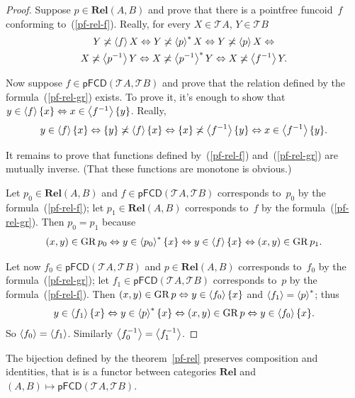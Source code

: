 \begin{proof}
Suppose $p\in\mathbf{Rel}(A,B)$ and prove that there is a pointfree
funcoid~$f$ conforming to~(\ref{pf-rel-f}). Really, for every
$X\in\mathscr{T}A$, $Y\in\mathscr{T}B$ 
\begin{multline*}
Y\not\asymp\left\langle f\right\rangle X\Leftrightarrow Y\not\asymp\left\langle p\right\rangle ^{\ast}X\Leftrightarrow Y\not\asymp\left\langle p\right\rangle X\Leftrightarrow\\
X\not\asymp\left\langle p^{-1}\right\rangle Y\Leftrightarrow X\not\asymp\left\langle p^{-1}\right\rangle ^{\ast}Y\Leftrightarrow X\not\asymp\left\langle f^{-1}\right\rangle Y.
\end{multline*}


Now suppose $f\in\mathsf{pFCD}(\mathscr{T}A,\mathscr{T}B)$ and prove
that the relation defined by the formula~(\ref{pf-rel-gr}) exists.
To prove it, it's enough to show that $y\in\left\langle f\right\rangle\{x\}\Leftrightarrow x\in\left\langle f^{-1}\right\rangle\{y\}$.
Really, 
\[
y\in\left\langle f\right\rangle\{x\}\Leftrightarrow\{y\}\not\asymp\left\langle f\right\rangle\{x\}\Leftrightarrow\{x\}\not\asymp\left\langle f^{-1}\right\rangle\{y\}\Leftrightarrow x\in\left\langle f^{-1}\right\rangle\{y\}.
\]


It remains to prove that functions defined by~(\ref{pf-rel-f}) and~(\ref{pf-rel-gr})
are mutually inverse. (That these functions are monotone is obvious.)

Let $p_{0}\in\mathbf{Rel}(A,B)$ and $f\in\mathsf{pFCD}(\mathscr{T}A,\mathscr{T}B)$
corresponds to~$p_{0}$ by the formula~(\ref{pf-rel-f}); let $p_{1}\in\mathbf{Rel}(A,B)$
corresponds to~$f$ by the formula~(\ref{pf-rel-gr}). Then $p_{0}=p_{1}$
because 
\[
(x,y)\in\operatorname{GR} p_{0}\Leftrightarrow y\in\left\langle p_{0}\right\rangle ^{\ast}\{x\}\Leftrightarrow y\in\left\langle f\right\rangle\{x\}\Leftrightarrow(x,y)\in\operatorname{GR} p_{1}.
\]


Let now $f_{0}\in\mathsf{pFCD}(\mathscr{T}A,\mathscr{T}B)$ and $p\in\mathbf{Rel}(A,B)$
corresponds to~$f_{0}$ by the formula~(\ref{pf-rel-gr}); let $f_{1}\in\mathsf{pFCD}(\mathscr{T}A,\mathscr{T}B)$
corresponds to~$p$ by the formula~(\ref{pf-rel-f}). Then $(x,y)\in\operatorname{GR} p\Leftrightarrow y\in\left\langle f_{0}\right\rangle\{x\}$
and $\left\langle f_{1}\right\rangle=\left\langle p\right\rangle ^{\ast}$; thus 
\[
y\in\left\langle f_{1}\right\rangle\{x\}\Leftrightarrow y\in\left\langle p\right\rangle ^{\ast}\{x\}\Leftrightarrow(x,y)\in\operatorname{GR} p\Leftrightarrow y\in\left\langle f_{0}\right\rangle\{x\}.
\]
So $\left\langle f_{0}\right\rangle=\left\langle f_{1}\right\rangle$. Similarly $\left\langle f_{0}^{-1}\right\rangle=\left\langle f_{1}^{-1}\right\rangle$.\end{proof}
\begin{prop}
The bijection defined by the theorem~\ref{pf-rel} preserves composition
and identities, that is is a functor between categories $\mathbf{Rel}$
and $(A,B)\mapsto\mathsf{pFCD}(\mathscr{T}A,\mathscr{T}B)$.\end{prop}
